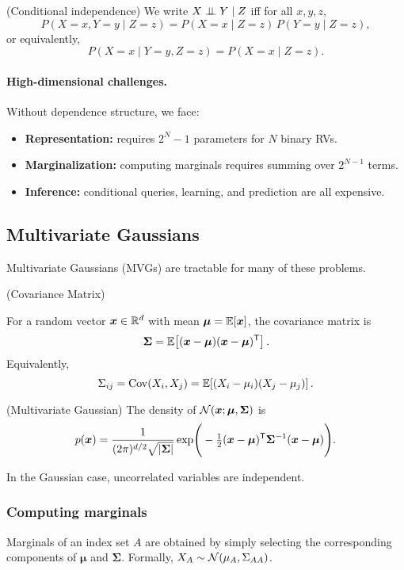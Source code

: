 \documentclass[11pt]{article}
\begin{document}
\begin{definition}
(Conditional independence)  
We write $X \perp \!\!\! \perp Y \mid Z$ iff for all $x, y, z$,
\[
P(X=x, Y=y \mid Z=z) = P(X=x \mid Z=z)\,P(Y=y \mid Z=z),
\]
or equivalently,
\[
P(X=x \mid Y=y, Z=z) = P(X=x \mid Z=z).
\]
\end{definition}

\paragraph{High-dimensional challenges.}
Without dependence structure, we face:
\begin{itemize}
    \item \textbf{Representation:} requires $2^N - 1$ parameters for $N$ binary RVs.
    \item \textbf{Marginalization:} computing marginals requires summing over $2^{N-1}$ terms.
    \item \textbf{Inference:} conditional queries, learning, and prediction are all expensive.
\end{itemize}

\subsection{Multivariate Gaussians}
Multivariate Gaussians (MVGs) are tractable for many of these problems.

\begin{definition}
(Covariance Matrix)  

For a random vector $\bm{x} \in \mathbb{R}^d$ with mean $\bm{\mu} = \mathbb{E}[\bm{x}]$, the covariance matrix is
\[
\bm{\Sigma} = \mathbb{E}\!\left[(\bm{x} - \bm{\mu})(\bm{x} - \bm{\mu})^{\mathsf{T}}\right].
\]
Equivalently,
\[
\Sigma_{ij} = \operatorname{Cov}(X_i, X_j) = \mathbb{E}\!\left[(X_i - \mu_i)(X_j - \mu_j)\right].
\]
\end{definition}

\begin{definition}
(Multivariate Gaussian)  
The density of $\mathcal{N}(\bm{x}; \bm{\mu}, \bm{\Sigma})$ is
\[
p(\bm{x}) = \frac{1}{(2\pi)^{d/2}\sqrt{\lvert \bm{\Sigma} \rvert}}
\exp\!\Bigg(-\tfrac{1}{2}(\bm{x} - \bm{\mu})^{\mathsf{T}} \bm{\Sigma}^{-1}(\bm{x} - \bm{\mu})\Bigg).
\]
\end{definition}

\begin{theorem}
In the Gaussian case, uncorrelated variables are independent.
\end{theorem}

\subsubsection{Computing marginals}
Marginals of an index set $A$ are obtained by simply selecting the corresponding components of $\bm{\mu}$ and $\bm{\Sigma}$.  
Formally, $X_A \sim \mathcal{N}(\mu_A, \Sigma_{AA})$.
\end{document}
